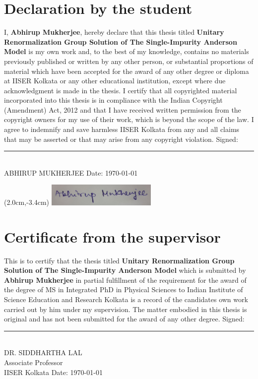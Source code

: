 \documentclass[12pt,twoside]{report}
\numberwithin{equation}{section}
\begin{document}
\chapter*{Declaration by the student}
I, {\large\textbf{Abhirup Mukherjee}}, hereby declare that this thesis titled {\large\textbf{Unitary Renormalization Group Solution of The Single-Impurity Anderson Model}} is my own work and, to the best of my knowledge, contains no materials previously published or written by any other person, or substantial proportions of material which have been accepted for the award of any other degree or diploma at IISER Kolkata or any other educational institution, except where due acknowledgment is made in the thesis. I certify that all copyrighted material incorporated into this thesis is in compliance with the Indian Copyright (Amendment) Act, 2012 and that I have received written permission from the copyright owners for my use of their work, which is beyond the scope of the law. I agree to indemnify and save harmless IISER Kolkata from any and all claims that may be asserted or that may arise from any copyright violation.
\pb
Signed:\\[20pt]
\rule[1em]{0.5\linewidth}{0.5pt}\\  %
ABHIRUP MUKHERJEE
\pb
Date:
\today

\begin{textblock*}{2cm}(2.0cm,-3.4cm)
	\includegraphics[width=150pt]{../figures/signature.jpg}
\end{textblock*}

\chapter*{Certificate from the supervisor}
This is to certify that the thesis titled {\large\textbf{Unitary Renormalization Group Solution of The Single-Impurity Anderson Model}} which is submitted by {\large\textbf{Abhirup Mukherjee}} in partial fulfillment of the requirement for the award of the degree of MS in Integrated PhD in Physical Sciences to Indian Institute of Science Education and Research Kolkata is a record of the candidates own work carried out by him under my supervision. The matter embodied in this thesis is original and has not been submitted for the award of any other degree.
\pb
Signed:\\[10pt]
\rule[1em]{0.5\linewidth}{0.5pt}\\  %
DR. SIDDHARTHA LAL\\
Associate Professor\\
IISER Kolkata
\pb
Date:
\today
\end{document}
